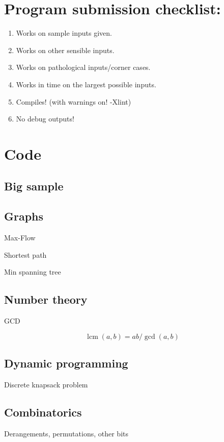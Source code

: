 \documentclass[10pt,a4paper]{article}
\newcommand{\codelisting}[1]{
  }
\DeclareMathOperator{\lcm}{lcm}
\begin{document}
\maketitle
\thispagestyle{myheadings}
\section*{Program submission checklist:}
\begin{enumerate}
\item Works on sample inputs given.
\item Works on other sensible inputs.
\item Works on pathological inputs/corner cases.
\item Works in time on the largest possible inputs.
\item Compiles! (with warnings on! -Xlint)
\item No debug outputs!
\end{enumerate}
\section*{Code}
\subsection*{Big sample}


\subsection*{Graphs}
Max-Flow
\codelisting{fordfulkerson.java}

Shortest path
\codelisting{dijkstra.java}

Min spanning tree
\codelisting{kruskal.java}

\subsection*{Number theory}
GCD
\codelisting{gcd.java}
\[\lcm(a,b) = ab/\gcd(a,b)\]

\subsection*{Dynamic programming}
Discrete knapsack problem
\codelisting{knapsack.java}

\subsection*{Combinatorics}
Derangements, permutations, other bits
\end{document}
